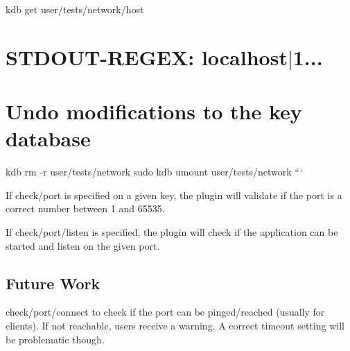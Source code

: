 kdb get user/tests/network/host \hypertarget{autotoc_md486_autotoc_md499}{}\section{S\+T\+D\+O\+U\+T-\/\+R\+E\+G\+E\+X\+: localhost$\vert$1...}\label{autotoc_md486_autotoc_md499}
\hypertarget{autotoc_md486_autotoc_md500}{}\section{Undo modifications to the key database}\label{autotoc_md486_autotoc_md500}
kdb rm -\/r user/tests/network sudo kdb umount user/tests/network ```

If {\ttfamily check/port} is specified on a given key, the plugin will validate if the port is a correct number between 1 and 65535.

If {\ttfamily check/port/listen} is specified, the plugin will check if the application can be started and listen on the given port.\hypertarget{autotoc_md486_autotoc_md501}{}\subsection{Future Work}\label{autotoc_md486_autotoc_md501}
{\ttfamily check/port/connect} to check if the port can be pinged/reached (usually for clients). If not reachable, users receive a warning. A correct timeout setting will be problematic though. 